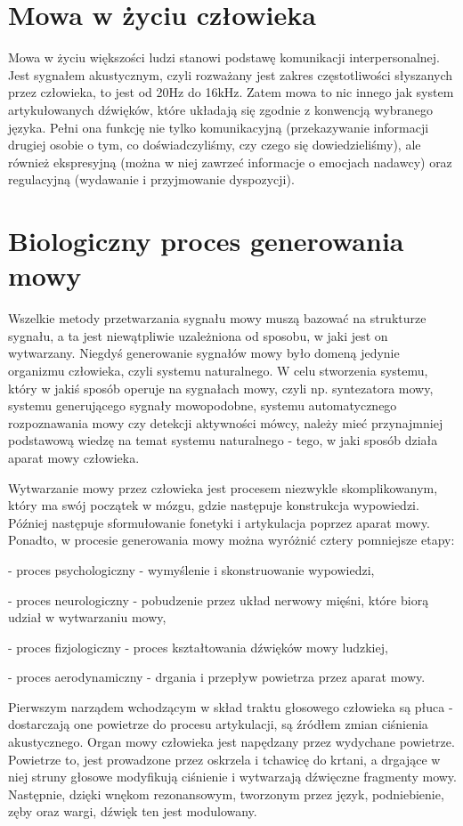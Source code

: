 \documentclass[eng,printmode]{mgr}
\begin{document}
 \section{Mowa w życiu człowieka}
 
 Mowa w życiu większości ludzi stanowi podstawę komunikacji interpersonalnej. Jest sygnałem akustycznym, czyli rozważany jest zakres częstotliwości słyszanych przez człowieka, to jest od 20Hz do 16kHz. Zatem mowa to nic innego jak system artykułowanych dźwięków, które układają się zgodnie z konwencją wybranego języka. Pełni ona funkcję nie tylko komunikacyjną (przekazywanie informacji drugiej osobie o tym, co doświadczyliśmy, czy czego się dowiedzieliśmy), ale również ekspresyjną (można w niej zawrzeć informacje o emocjach nadawcy) oraz regulacyjną (wydawanie i przyjmowanie dyspozycji). 
 
 
 \section{Biologiczny proces generowania mowy}
 Wszelkie metody przetwarzania sygnału mowy muszą bazować na strukturze sygnału, a ta jest niewątpliwie uzależniona od sposobu, w jaki jest on wytwarzany. Niegdyś generowanie sygnałów mowy było domeną jedynie organizmu człowieka, czyli systemu naturalnego. W celu stworzenia systemu, który w jakiś sposób operuje na sygnałach mowy, czyli np. syntezatora mowy, systemu generującego sygnały mowopodobne, systemu automatycznego rozpoznawania mowy czy detekcji aktywności mówcy, należy mieć przynajmniej podstawową wiedzę na temat systemu naturalnego - tego, w jaki sposób działa aparat mowy człowieka.
 
 Wytwarzanie mowy przez człowieka jest procesem niezwykle skomplikowanym, który ma swój początek w mózgu, gdzie następuje konstrukcja wypowiedzi. Później następuje sformułowanie fonetyki i artykulacja poprzez aparat mowy. Ponadto, w procesie generowania mowy można wyróżnić cztery pomniejsze etapy:
	 
	 - proces psychologiczny - wymyślenie i skonstruowanie wypowiedzi,
	 
	 - proces neurologiczny - pobudzenie przez układ nerwowy mięśni, które biorą udział w wytwarzaniu mowy,
	 
	 - proces fizjologiczny - proces kształtowania dźwięków mowy ludzkiej,
	 
	 - proces aerodynamiczny - drgania i przepływ powietrza przez aparat mowy. 
  
  Pierwszym narządem wchodzącym w skład traktu głosowego człowieka są płuca - dostarczają one powietrze do procesu artykulacji, są źródłem zmian ciśnienia akustycznego. Organ mowy człowieka jest napędzany przez wydychane powietrze. Powietrze to, jest prowadzone przez oskrzela i tchawicę do krtani, a drgające w niej struny głosowe modyfikują ciśnienie i wytwarzają dźwięczne fragmenty mowy.  Następnie, dzięki wnękom rezonansowym, tworzonym przez język, podniebienie, zęby oraz wargi, dźwięk ten jest modulowany. 
\end{document}

